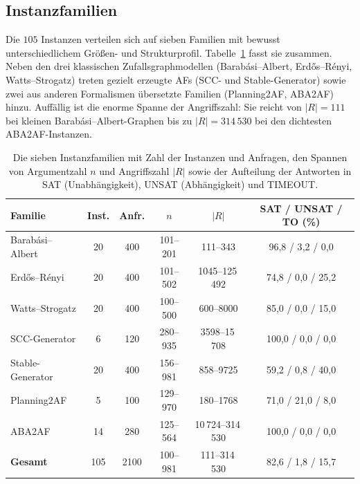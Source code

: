\subsection{Instanzfamilien}
\label{subsec:sz-familien}

Die \(105\) Instanzen verteilen sich auf sieben Familien mit bewusst
unterschiedlichem Gr\"o\ss en- und Strukturprofil.
Tabelle~\ref{tab:sz-familien} fasst sie zusammen. Neben den drei klassischen
Zufallsgraphmodellen (Barab\'asi--Albert, Erd\H{o}s--R\'enyi,
Watts--Strogatz) treten gezielt erzeugte AFs (SCC- und Stable-Generator) sowie
zwei aus anderen Formalismen \"ubersetzte Familien (Planning2AF, ABA2AF)
hinzu. Auff\"allig ist die enorme Spanne der Angriffszahl: Sie reicht von
\(|R|=111\) bei kleinen Barab\'asi--Albert-Graphen bis zu \(|R|=314\,530\) bei
den dichtesten ABA2AF-Instanzen.

\begin{table}[htbp]
    \myfloatalign
    \begin{tabularx}{\textwidth}{Xccccc} \toprule
        Familie & Inst. & Anfr. & \(n\) & \(|R|\) &
                  SAT / UNSAT / TO (\%) \\ \midrule
        Barab\'asi--Albert & 20 & 400 & 101--201 & 111--343 &
            96{,}8 / 3{,}2 / 0{,}0 \\
        Erd\H{o}s--R\'enyi  & 20 & 400 & 101--502 & 1045--125\,492 &
            74{,}8 / 0{,}0 / 25{,}2 \\
        Watts--Strogatz    & 20 & 400 & 100--500 & 600--8000 &
            85{,}0 / 0{,}0 / 15{,}0 \\
        SCC-Generator      &  6 & 120 & 280--935 & 3598--15\,708 &
            100{,}0 / 0{,}0 / 0{,}0 \\
        Stable-Generator   & 20 & 400 & 156--981 & 858--9725 &
            59{,}2 / 0{,}8 / 40{,}0 \\
        Planning2AF        &  5 & 100 & 129--970 & 180--1768 &
            71{,}0 / 21{,}0 / 8{,}0 \\
        ABA2AF             & 14 & 280 & 125--564 & 10\,724--314\,530 &
            100{,}0 / 0{,}0 / 0{,}0 \\ \midrule
        \textbf{Gesamt}    & 105 & 2100 & 100--981 & 111--314\,530 &
            82{,}6 / 1{,}8 / 15{,}7 \\
        \bottomrule
    \end{tabularx}
    \caption[Instanzfamilien des \texttt{singleton\_z}-Experiments]{Die sieben
    Instanzfamilien mit Zahl der Instanzen und Anfragen, den Spannen von
    Argumentzahl \(n\) und Angriffszahl \(|R|\) sowie der Aufteilung der
    Antworten in SAT (Unabh\"angigkeit), UNSAT (Abh\"angigkeit) und TIMEOUT.}
    \label{tab:sz-familien}
\end{table}

